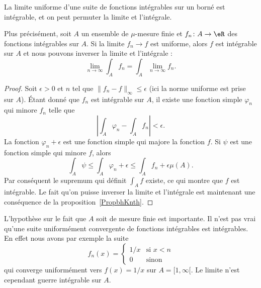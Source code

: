 \begin{theorem}			\label{ThoUnifCvIntRiem}
    La limite uniforme d'une suite de fonctions intégrables sur un borné est intégrable, et on peut permuter la limite et l'intégrale.

    Plus précisément, soit \( A\) un ensemble de \( \mu\)-mesure finie et \( f_n\colon A\to \eR\) des fonctions intégrables sur \( A\). Si la limite \( f_n\to f\) est uniforme, alors \( f\) est intégrable sur \( A\) et nous pouvons inverser la limite et l'intégrale :
    \begin{equation}
        \lim_{n\to \infty} \int_A f_n=\int_A\lim_{n\to \infty} f_n.
    \end{equation}
\end{theorem}

\begin{proof}
    Soit \( \epsilon>0\) et \( n\) tel que \( \| f_n-f \|_{\infty}\leq \epsilon\) (ici la norme uniforme est prise sur \( A\)). Étant donné que \( f_n\) est intégrable sur \( A\), il existe une fonction simple \( \varphi_n\) qui minore \( f_n\) telle que
    \begin{equation}
        \left| \int_{A}\varphi_n-\int_A f_n \right| <\epsilon.
    \end{equation}
    La fonction \( \varphi_n+\epsilon\) est une fonction simple qui majore la fonction \( f\). Si \( \psi\) est une fonction simple qui minore \( f\), alors
    \begin{equation}
        \int_A\psi\leq\int_A\varphi_n+\epsilon\leq\int_A f_n+\epsilon\mu(A).
    \end{equation}
    Par conséquent le supremum qui définit \( \int_A f\) existe, ce qui montre que \( f\) est intégrable. Le fait qu'on puisse inverser la limite et l'intégrale est maintenant une conséquence de la proposition~\ref{PropbhKnth}.
\end{proof}

\begin{remark}
    L'hypothèse sur le fait que \( A\) soit de mesure finie est importante. Il n'est pas vrai qu'une suite uniformément convergente de fonctions intégrables est intégrables. En effet nous avons par exemple la suite
    \begin{equation}
        f_n(x)=\begin{cases}
            1/x    &   \text{si } x<n\\
            0    &    \text{sinon}
        \end{cases}
    \end{equation}
    qui converge uniformément vers \( f(x)=1/x\) sur \( A=\mathopen[ 1 , \infty [\). Le limite n'est cependant guerre intégrable sur \( A\).
\end{remark}

